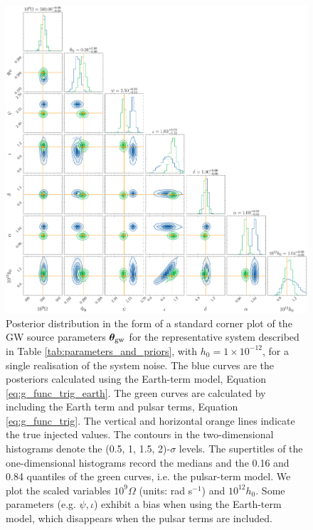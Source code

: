 \documentclass[fleqn,usenatbib,useAMS]{mnras}
\begin{document}
\begin{figure}
	\includegraphics[width=\textwidth, height =\textwidth ]{images/corner_highSNR_compare}
	\caption{Posterior distribution in the form of a standard corner plot of the GW source parameters $\boldsymbol{\theta}_{\rm gw}$ for the representative system described in Table \ref{tab:parameters_and_priors}, with $h_0 = 1 \times 10^{-12}$, for a single realisation of the system noise. The blue curves are the posteriors calculated using the Earth-term model, Equation \eqref{eq:g_func_trig_earth}. The green curves are calculated by including the Earth term and pulsar terms, Equation \eqref{eq:g_func_trig}. The vertical and horizontal orange lines indicate the true injected values. The contours in the two-dimensional histograms denote the (0.5, 1, 1.5, 2)-$\sigma$ levels. The supertitles of the one-dimensional histograms record the medians and the 0.16 and 0.84 quantiles of the green curves, i.e. the pulsar-term model. We plot the scaled variables $10^9 \Omega$ (units: rad s$^{-1}$) and $10^{12} h_0$. Some parameters (e.g. $\psi, \iota$) exhibit a bias when using the Earth-term model, which disappears when the pulsar terms are included.}
	\label{fig:corner_plot_compare_high}
\end{figure}
\end{document}

